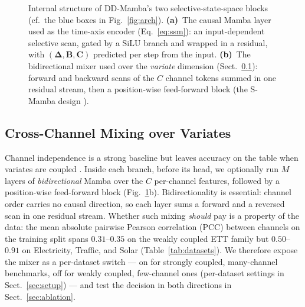 \documentclass[runningheads]{llncs}
\newcommand{\model}{DD-Mamba}
\begin{document}
\begin{figure}[tb]
{}
\caption{Internal structure of \model{}'s two selective-state-space blocks
(cf.\ the blue boxes in Fig.~\ref{fig:arch}). \textbf{(a)}~The causal Mamba
layer used as the time-axis encoder (Eq.~\eqref{eq:ssm}): an input-dependent
selective scan, gated by a SiLU branch and wrapped in a residual, with
$(\boldsymbol{\Delta},\mathbf{B},\mathbf{C})$ predicted per step from the
input. \textbf{(b)}~The bidirectional mixer used over the \emph{variate}
dimension (Sect.~\ref{sec:mixer}): forward and backward scans of the $C$
channel tokens summed in one residual stream, then a position-wise
feed-forward block (the S-Mamba design \cite{smamba}).}
\label{fig:blocks}
\end{figure}

\subsection{Cross-Channel Mixing over Variates}
\label{sec:mixer}

Channel independence is a strong baseline \cite{patchtst,dlinear} but
leaves accuracy on the table when variates are coupled
\cite{itransformer,smamba,crossformer}. Inside each branch, before its
head, we optionally run $M$ layers of \emph{bidirectional} Mamba over the
$C$ per-channel features, followed by a position-wise feed-forward block
(Fig.~\ref{fig:blocks}b). Bidirectionality is essential: channel order
carries no causal direction, so each layer sums a forward and a reversed
scan in one residual stream. Whether such mixing \emph{should} pay is a
property of the data: the mean absolute pairwise Pearson correlation (PCC)
between channels on the training split spans $0.31$--$0.35$ on the
weakly coupled ETT family but $0.50$--$0.91$ on Electricity, Traffic, and
Solar (Table~\ref{tab:datasets}). We therefore expose the mixer as a
per-dataset switch --- on for strongly coupled, many-channel benchmarks,
off for weakly coupled, few-channel ones (per-dataset settings in
Sect.~\ref{sec:setup}) --- and test the decision in both directions in
Sect.~\ref{sec:ablation}.
\end{document}
